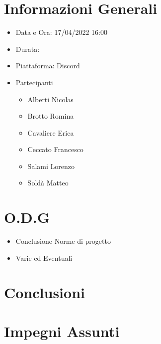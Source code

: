 \documentclass[a4paper, 12pt]{article}
\begin{document}
\makefrontpage

\section*{Informazioni Generali}
\begin{itemize}
    \item Data e Ora: 17/04/2022 16:00
    \item Durata: 
    \item Piattaforma: Discord
    \item Partecipanti
    \begin{itemize}
        \item Alberti Nicolas
        \item Brotto Romina
        \item Cavaliere Erica
        \item Ceccato Francesco
        \item Salami Lorenzo
        \item Soldà Matteo
    \end{itemize}
\end{itemize}

\section*{O.D.G}
\begin{itemize}
    \item Conclusione Norme di progetto
    \item Varie ed Eventuali
\end{itemize}
\section*{Conclusioni}

\section*{Impegni Assunti}
\end{document}
